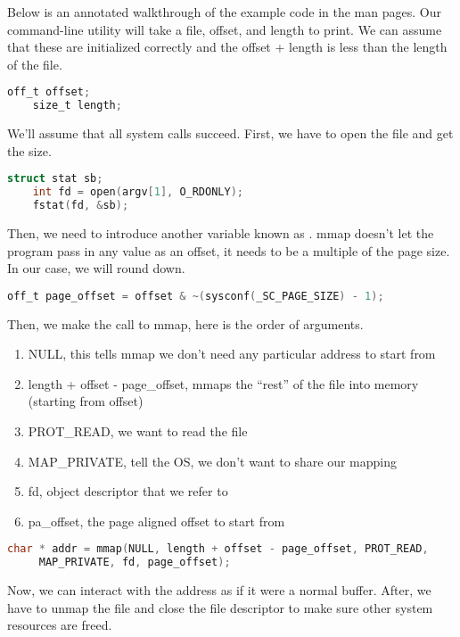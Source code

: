 Below is an annotated walkthrough of the example code in the man pages.
Our command-line utility will take a file, offset, and length to print.
We can assume that these are initialized correctly and the offset + length is less than the length of the file.
	 
\begin{lstlisting}[language=C]
	off_t offset;
	size_t length;
\end{lstlisting}
	 
We'll assume that all system calls succeed.
First, we have to open the file and get the size.
	 
\begin{lstlisting}[language=C]
	struct stat sb;
	int fd = open(argv[1], O_RDONLY);
	fstat(fd, &sb);
\end{lstlisting}
	 
Then, we need to introduce another variable known as .
mmap doesn't let the program pass in any value as an offset, it needs to be a multiple of the page size.
In our case, we will round down.
	 
\begin{lstlisting}[language=C]
	off_t page_offset = offset & ~(sysconf(_SC_PAGE_SIZE) - 1);
\end{lstlisting}
	 
Then, we make the call to mmap, here is the order of arguments.
\begin{enumerate}
	\item NULL, this tells mmap we don't need any particular address to start from
	\item length + offset - page\_offset, mmaps the ``rest'' of the file into memory (starting from offset)
	\item PROT\_READ, we want to read the file
	\item MAP\_PRIVATE, tell the OS, we don't want to share our mapping
	\item fd, object descriptor that we refer to
	\item pa\_offset, the page aligned offset to start from
\end{enumerate}
	 
\begin{lstlisting}[language=C]
	char * addr = mmap(NULL, length + offset - page_offset, PROT_READ,
	 MAP_PRIVATE, fd, page_offset);
\end{lstlisting}
	 
Now, we can interact with the address as if it were a normal buffer.
After, we have to unmap the file and close the file descriptor to make sure other system resources are freed.
	 
